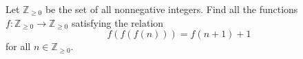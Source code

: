 Let $\mathbb{Z}_{\geq 0}$ be the set of all nonnegative integers. Find all the functions $f \colon \mathbb{Z}_{\geq 0} \to \mathbb{Z}_{\geq 0}$ satisfying the relation
\[
f(f(f(n))) = f(n+1) + 1
\]
for all $n \in \mathbb{Z}_{\geq 0}$.
